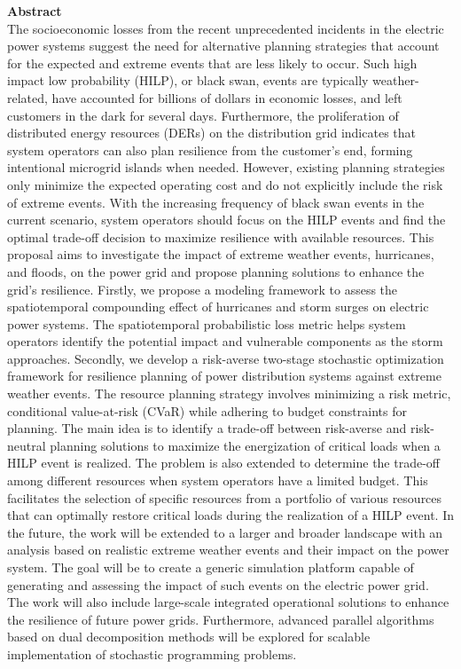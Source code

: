 \textbf{\centering \large Abstract \\}
The socioeconomic losses from the recent unprecedented incidents in the electric power systems suggest the need for alternative planning strategies that account for the expected and extreme events that are less likely to occur. Such high impact low probability (HILP), or black swan, events are typically weather-related, have accounted for billions of dollars in economic losses, and left customers in the dark for several days. Furthermore, the proliferation of distributed energy resources (DERs) on the distribution grid indicates that system operators can also plan resilience from the customer's end, forming intentional microgrid islands when needed. However, existing planning strategies only minimize the expected operating cost and do not explicitly include the risk of extreme events. With the increasing frequency of black swan events in the current scenario, system operators should focus on the HILP events and find the optimal trade-off decision to maximize resilience with available resources. This proposal aims to investigate the impact of extreme weather events, hurricanes, and floods, on the power grid and propose planning solutions to enhance the grid's resilience. Firstly, we propose a modeling framework to assess the spatiotemporal compounding effect of hurricanes and storm surges on electric power systems. The spatiotemporal probabilistic loss metric helps system operators identify the potential impact and vulnerable components as the storm approaches. Secondly, we develop a risk-averse two-stage stochastic optimization framework for resilience planning of power distribution systems against extreme weather events. The resource planning strategy involves minimizing a risk metric, conditional value-at-risk (CVaR) while adhering to budget constraints for planning. The main idea is to identify a trade-off between risk-averse and risk-neutral planning solutions to maximize the energization of critical loads when a HILP event is realized. The problem is also extended to determine the trade-off among different resources when system operators have a limited budget. This facilitates the selection of specific resources from a portfolio of various resources that can optimally restore critical loads during the realization of a HILP event. In the future, the work will be extended to a larger and broader landscape with an analysis based on realistic extreme weather events and their impact on the power system. The goal will be to create a generic simulation platform capable of generating and assessing the impact of such events on the electric power grid. The work will also include large-scale integrated operational solutions to enhance the resilience of future power grids. Furthermore, advanced parallel algorithms based on dual decomposition methods will be explored for scalable implementation of stochastic programming problems.
